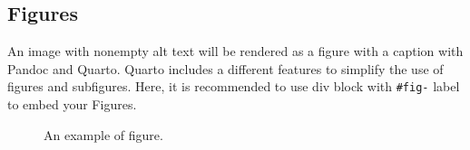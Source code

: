\documentclass[
  journal,
]{IEEEtran}%
\begin{document}
\subsection{Figures}\label{figures}

An image with nonempty alt text will be rendered as a figure with a
caption with Pandoc and Quarto. Quarto includes a different features to
simplify the use of figures and subfigures. Here, it is recommended to
use div block with \texttt{\#fig-} label to embed your Figures.

\begin{figure}


\caption{\label{fig-1}An example of figure.}

\end{figure}%
\end{document}
